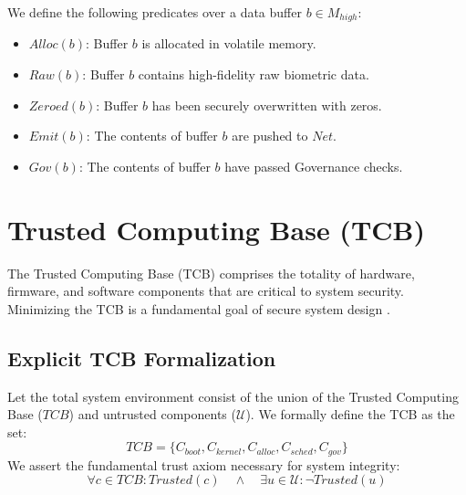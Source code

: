 \documentclass[conference]{IEEEtran}
\begin{document}
We define the following predicates over a data buffer $b \in M_{high}$:
\begin{itemize}
    \item $Alloc(b)$: Buffer $b$ is allocated in volatile memory.
    \item $Raw(b)$: Buffer $b$ contains high-fidelity raw biometric data.
    \item $Zeroed(b)$: Buffer $b$ has been securely overwritten with zeros.
    \item $Emit(b)$: The contents of buffer $b$ are pushed to $Net$.
    \item $Gov(b)$: The contents of buffer $b$ have passed Governance checks.
\end{itemize}

\section{Trusted Computing Base (TCB)}
The Trusted Computing Base (TCB) comprises the totality of hardware, firmware, and software components that are critical to system security. Minimizing the TCB is a fundamental goal of secure system design \cite{b3}. 



\subsection{Explicit TCB Formalization}
Let the total system environment consist of the union of the Trusted Computing Base ($TCB$) and untrusted components ($\mathcal{U}$). We formally define the TCB as the set:
\begin{equation}
TCB = \{ C_{boot}, C_{kernel}, C_{alloc}, C_{sched}, C_{gov} \}
\end{equation}
We assert the fundamental trust axiom necessary for system integrity:
\begin{equation}
\forall c \in TCB : Trusted(c) \quad \land \quad \exists u \in \mathcal{U} : \neg Trusted(u)
\end{equation}
\end{document}
